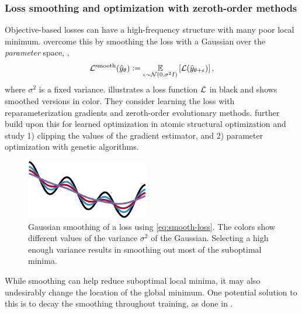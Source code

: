 \subsubsection{Loss smoothing and optimization with zeroth-order methods}
\label{sec:smooth}

Objective-based losses can have a high-frequency
structure with many poor local minimum.
\citet{metz2019understanding} overcome this by smoothing
the loss with a Gaussian over the \emph{parameter} space, \ie,
\begin{equation}
  {\mathcal{L}}^{\rm smooth}(\hat y_\theta)\vcentcolon= \operatorname*{\mathbb{E}}_{\epsilon\sim{\mathcal{N}}(0,\sigma^2 I)}\left[{\mathcal{L}}(\hat y_{\theta+\epsilon})\right],
  \label{eq:smooth-loss}
\end{equation}
where $\sigma^2$ is a fixed variance.
 illustrates a loss function ${\mathcal{L}}$ in
black and shows smoothed versions in color.
They consider learning the loss with reparameterization
gradients and zeroth-order evolutionary methods.
\citet{merchant2021learn2hop} further
build upon this for learned optimization in
atomic structural optimization
and study 1) clipping the values of the gradient estimator,
and 2) parameter optimization with genetic algorithms.

\begin{figure}[t]
\centering
\includegraphics[width=2.1in]{fig/smoothed-loss.pdf}
\caption{Gaussian smoothing of a loss using \cref{eq:smooth-loss}.
  The colors show different values of the variance $\sigma^2$
  of the Gaussian. Selecting a high enough variance results in
  smoothing out most of the suboptimal minima.}
\label{fig:smooth-loss}
\end{figure}

\begin{remark}
  While smoothing can help reduce suboptimal local
  minima, it may also undesirably change the
  location of the global minimum.
  One potential solution to this is to decay
  the smoothing throughout training, as done
  in \citet[Appendix~A.1]{amos2021model}.
\end{remark}

